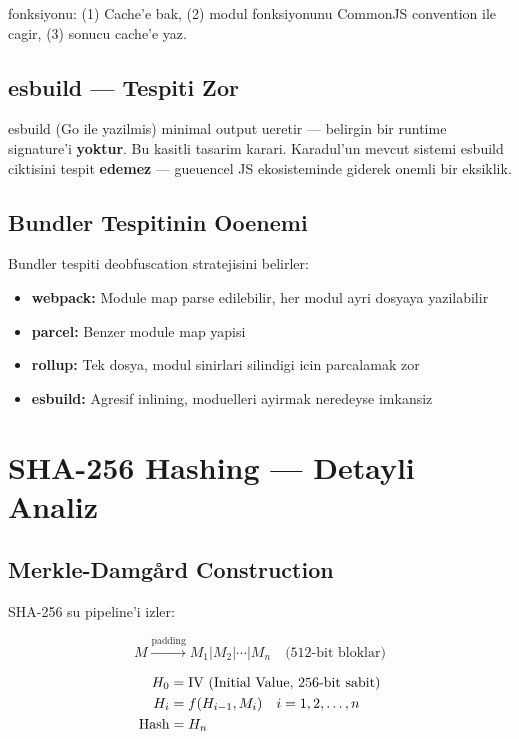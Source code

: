  fonksiyonu: (1) Cache'e bak, (2) modul fonksiyonunu CommonJS convention ile cagir, (3) sonucu cache'e yaz.

\subsection{esbuild --- Tespiti Zor}

esbuild (Go ile yazilmis) minimal output ueretir --- belirgin bir runtime signature'i \textbf{yoktur}. Bu kasitli tasarim karari. Karadul'un mevcut sistemi esbuild ciktisini tespit \textbf{edemez} --- gueuencel JS ekosisteminde giderek onemli bir eksiklik.

\subsection{Bundler Tespitinin Ooenemi}

Bundler tespiti deobfuscation stratejisini belirler:
\begin{itemize}
\item \textbf{webpack:} Module map parse edilebilir, her modul ayri dosyaya yazilabilir
\item \textbf{parcel:} Benzer module map yapisi
\item \textbf{rollup:} Tek dosya, modul sinirlari silindigi icin parcalamak zor
\item \textbf{esbuild:} Agresif inlining, moduelleri ayirmak neredeyse imkansiz
\end{itemize}


\section{SHA-256 Hashing --- Detayli Analiz}
\label{sec:sha256-detail}

\subsection{Merkle-Damg\r{a}rd Construction}

SHA-256 su pipeline'i izler:

\begin{equation}
M \xrightarrow{\text{padding}} M_1 | M_2 | \cdots | M_n \quad \text{(512-bit bloklar)}
\end{equation}

\begin{align}
H_0 &= \text{IV (Initial Value, 256-bit sabit)} \notag \\
H_i &= f(H_{i-1}, M_i) \quad i = 1, 2, \ldots, n \notag \\
\text{Hash} &= H_n \notag
\end{align}

